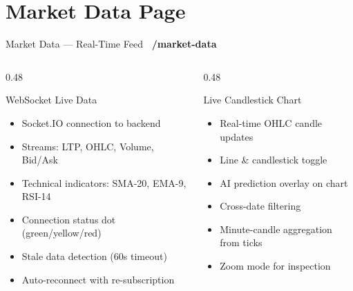 \documentclass[aspectratio=169, 11pt]{beamer}
\newcommand{\tagbox}[2]{\colorbox{#1}{\scriptsize\color{white}\textbf{~#2~}}}
\begin{document}
\section{Market Data Page}
\begin{frame}{Market Data — Real-Time Feed \hfill \tagbox{accentblue}{/market-data}}
\begin{columns}[T]
\begin{column}{0.48\textwidth}
\begin{block}{WebSocket Live Data}
\begin{itemize}
  \item Socket.IO connection to backend
  \item Streams: LTP, OHLC, Volume, Bid/Ask
  \item Technical indicators: SMA-20, EMA-9, RSI-14
  \item Connection status dot (green/yellow/red)
  \item Stale data detection (60s timeout)
  \item Auto-reconnect with re-subscription
\end{itemize}
\end{block}
\end{column}
\begin{column}{0.48\textwidth}
\begin{block}{Live Candlestick Chart}
\begin{itemize}
  \item Real-time OHLC candle updates
  \item Line \& candlestick toggle
  \item AI prediction overlay on chart
  \item Cross-date filtering
  \item Minute-candle aggregation from ticks
  \item Zoom mode for inspection
\end{itemize}
\end{block}
\end{column}
\end{columns}
\end{frame}
\end{document}

